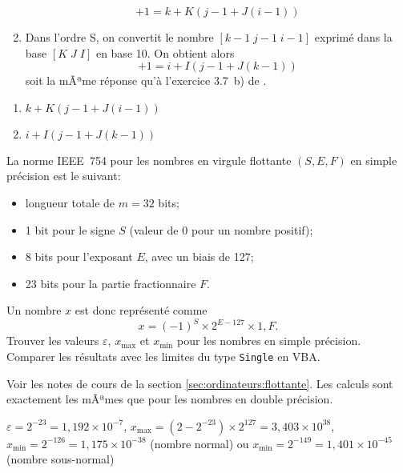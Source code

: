 \begin{exercice}
\begin{sol}
\begin{enumerate}
      \begin{displaymath}
        [((i - 1) \times J + j - 1) \times K + k - 1] + 1
        = k + K (j - 1 + J (i - 1))
      \end{displaymath}
    \item Dans l'ordre S, on convertit le nombre $[k - 1\; j - 1\; i -
      1]$ exprimé dans la base $[K\; J\; I]$ en base 10. On obtient alors
      \begin{displaymath}
        [((k - 1) \times J + j - 1) \times I + i - 1] + 1
        = i + I (j - 1 + J (k - 1))
      \end{displaymath}
      soit la mÃªme réponse qu'à l'exercice 3.7~b) de
      \cite{Goulet_intro_S}.
    \end{enumerate}
  \end{sol}
  \begin{rep}
    \begin{enumerate}
    \item $k + K (j - 1 + J (i - 1))$
    \item $i + I (j - 1 + J (k - 1))$
    \end{enumerate}
  \end{rep}
\end{exercice}

\begin{exercice}
  La norme IEEE~754 pour les nombres en virgule flottante $(S,
  E, F)$ en simple précision est le suivant:
  \begin{itemize}
  \item longueur totale de $m = 32$ bits;
  \item 1 bit pour le signe $S$ (valeur de 0 pour un nombre positif);
  \item 8 bits pour l'exposant $E$, avec un biais de 127;
  \item 23 bits pour la partie fractionnaire $F$.
  \end{itemize}
  Un nombre $x$ est donc représenté comme
  \begin{displaymath}
    x = (-1)^S \times 2^{E - 127} \times 1,F.
  \end{displaymath}
  Trouver les valeurs $\varepsilon$, $x_{\max}$ et $x_{\min}$ pour les
  nombres en simple précision. Comparer les résultats avec les limites
  du type \texttt{Single} en VBA.
  \begin{sol}
    Voir les notes de cours de la section
    \ref{sec:ordinateurs:flottante}. Les calculs sont exactement les
    mÃªmes que pour les nombres en double précision.
  \end{sol}
  \begin{rep}
    $\varepsilon = 2^{-23} = 1,192 \times 10^{-7}$,
    $x_{\max} = (2 - 2^{-23}) \times 2^{127} = 3,403 \times 10^{38}$,
    $x_{\min} = 2^{-126} = 1,175 \times 10^{-38}$ (nombre normal) ou
    $x_{\min} = 2^{-149} = 1,401 \times 10^{-45}$ (nombre sous-normal)
  \end{rep}
\end{exercice}

